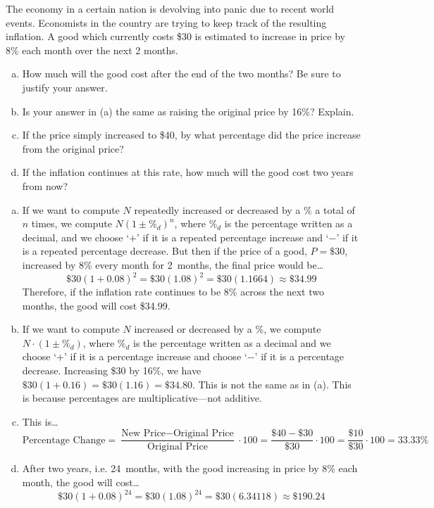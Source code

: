 \documentclass[11pt,letterpaper]{article}
\begin{document}
 The economy in a certain nation is devolving into panic due to recent world events. Economists in the country are trying to keep track of the resulting inflation. A good which currently costs \$30 is estimated to increase in price by 8\% each month over the next 2 months. 
	\begin{enumerate}[(a)]
	\item How much will the good cost after the end of the two months? Be sure to justify your answer. 
	\item Is your answer in (a) the same as raising the original price by 16\%? Explain. 
	\item If the price simply increased to \$40, by what percentage did the price increase from the original price?
	\item If the inflation continues at this rate, how much will the good cost two years from now?	
	\end{enumerate} \pspace

\sol 
\begin{enumerate}[(a)]
\item If we want to compute $N$ repeatedly increased or decreased by a \% a total of $n$ times, we compute $N(1 \pm \%_d)^n$, where $\%_d$ is the percentage written as a decimal, and we choose `$+$' if it is a repeated percentage increase and `$-$' if it is a repeated percentage decrease. But then if the price of a good, $P= \$30$, increased by 8\% every month for 2~months, the final price would be\dots
	\[
	\$30 (1 + 0.08)^2= \$30(1.08)^2= \$30(1.1664) \approx \$34.99
	\]
Therefore, if the inflation rate continues to be 8\% across the next two months, the good will cost \$34.99. \pspace

\item If we want to compute $N$ increased or decreased by a \%, we compute $N \cdot (1 \pm \%_d)$, where $\%_d$ is the percentage written as a decimal and we choose `$+$' if it is a percentage increase and choose `$-$' if it is a percentage decrease. Increasing \$30 by 16\%, we have $\$30(1 + 0.16)= \$30(1.16)= \$34.80$. This is not the same as in (a). This is because percentages are multiplicative---not additive. \pspace

\item This is\dots
	\[
	\text{Percentage Change}= \dfrac{\text{New Price} - \text{Original Price}}{\text{Original Price}} \cdot 100= \dfrac{\$40 - \$30}{\$30} \cdot 100= \dfrac{\$10}{\$30} \cdot 100= 33.33\%
	\] \pspace

\item After two years, i.e. 24~months, with the good increasing in price by 8\% each month, the good will cost\dots
	\[
	\$30 (1 + 0.08)^{24}= \$30(1.08)^{24}= \$30(6.34118) \approx \$190.24
	\]
\end{enumerate}
\end{document}
